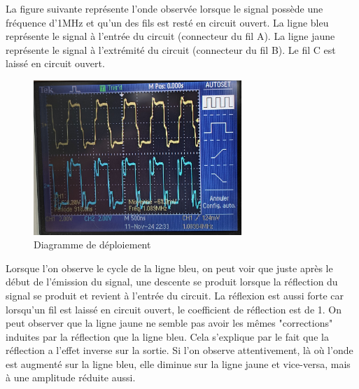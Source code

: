  La figure suivante représente l'onde observée lorsque le signal possède une fréquence d'1MHz et qu'un des fils est resté en circuit ouvert. La
 ligne bleu représente le signal à l'entrée du circuit (connecteur du fil A). La ligne jaune représente le signal à l'extrémité du circuit
 (connecteur du fil B). Le fil C est laissé en circuit ouvert.

\begin{figure}[H]
    \centering
    \includegraphics[width=0.7\textwidth]{images/1mhz.jpg}
    \caption{Diagramme de déploiement}
    \label{fig:Signal à 1MHz}
\end{figure}

Lorsque l'on observe le cycle de la ligne bleu, on peut voir que juste après le début de l'émission du signal, une descente se produit lorsque
la réflection du signal se produit et revient à l'entrée du circuit. La réflexion est aussi forte car lorsqu'un fil est laissé en circuit ouvert,
le coefficient de réflection est de 1. On peut observer que la ligne jaune ne semble pas avoir les mêmes "corrections" induites par la réflection
que la ligne bleu. Cela s'explique par le fait que la réflection a l'effet inverse sur la sortie. Si l'on observe attentivement, là où l'onde est
augmenté sur la ligne bleu, elle diminue sur la ligne jaune et vice-versa, mais à une amplitude réduite aussi.